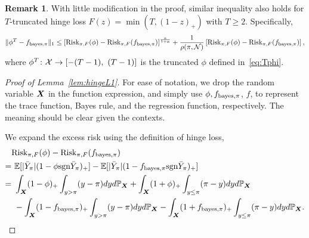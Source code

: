 \documentclass[11pt]{article}
\theoremstyle{plain}
\theoremstyle{definition}
\newtheorem{rmk}{Remark}
\def\sign{\textup{sgn}}
\def\bayespif{f_{\textup{bayes},\pi}}
\def\shift{\bar Y_\pi}
\def\riskF{\textup{Risk}_{\pi,F}}
\begin{document}
\begin{rmk}\label{rmk:truncate}With little modification in the proof, similar inequality also holds for $T$-truncated hinge loss $F(z)=\min(T,(1-z)_{+})$ with $T\geq 2$. Specifically, 
\[
\onenormSize{}{\phi^T-\bayespif}\leq \left[\riskF(\phi)-\riskF(\bayespif)\right]^{\alpha\over 1+\alpha}+
 {1\over \rho(\pi, \tN)}\left[\riskF(\phi)-\riskF(\bayespif)\right],
\]
where $\phi^T\colon\tX\to[-(T-1),\ (T-1)]$ is the truncated $\phi$ defined in~\eqref{eq:Tphi}.
\end{rmk}


\begin{proof}[Proof of Lemma~\ref{lem:hingeL1}] For ease of notation, we drop the random variable $\bm X$ in the function expression, and simply use $\phi, \bayespif$, $f$, to represent the trace function, Bayes rule, and the regression function, respectively. The meaning should be clear given the contexts. 

We expand the excess risk using the definition of hinge loss,
\begin{align}\label{eq:function}
&\riskF(\phi)-\riskF(\bayespif)\notag\\
=&\  \mathbb{E}[|\shift|(1-\phi\sign\shift)_{+}]-\mathbb{E}[|\shift|(1-\bayespif\sign\shift)_{+}] \notag\\
= &\ \int_{\mX} (1-\phi)_{+} \int_{y>\pi}(y-\pi)dy d\mathbb{P}_{\mX}+\int_{\mX}(1+\phi)_{+}  \int_{y\leq \pi}(\pi-y)dy d\mathbb{P}_{\mX} \notag \\
&\ -\int_{\mX} (1-\bayespif)_{+} \int_{y>\pi}(y-\pi)dy d\mathbb{P}_{\mX}-\int_{\mX}(1+\bayespif)_{+}  \int_{y\leq \pi}(\pi-y)dy d\mathbb{P}_{\mX}.
\end{align}


\end{proof}
\end{document}
